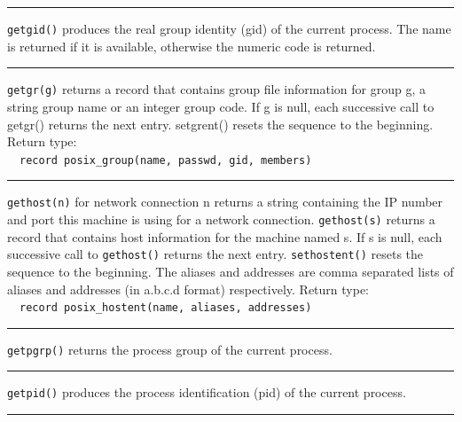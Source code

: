 \bigskip\hrule\vspace{0.1cm}

\noindent
\texttt{getgid()} produces the real group identity (gid) of the current process.
The name is returned if it is available, otherwise the numeric code is
returned.

\bigskip\hrule\vspace{0.1cm}

\noindent
\texttt{getgr(g)} returns a record that contains group file
information for group
g, a string group name or an integer group code. If g is null, each
successive call to getgr() returns the next entry. setgrent() resets
the sequence to the beginning. Return type:\\
\ \ \texttt{record posix\_group(name, passwd, gid, members)}

\bigskip\hrule\vspace{0.1cm}

\noindent
\texttt{gethost(n)} for network connection n returns a string containing
the IP number and port this machine is using for a network connection.
\texttt{gethost(s)} returns a record that contains host information for the
machine named s. If s is null, each successive call to \texttt{gethost()}
returns the next entry. \texttt{sethostent()} resets the sequence to the
beginning. The aliases and addresses are comma separated lists of
aliases and addresses (in a.b.c.d format) respectively. Return
type:\\
\ \ \texttt{record posix\_hostent(name, aliases, addresses)}

\bigskip\hrule\vspace{0.1cm}

\noindent
\texttt{getpgrp()} returns the process group of the current process. 

\bigskip\hrule\vspace{0.1cm}

\noindent
\texttt{getpid()} produces the process identification (pid) of the current
process.

\bigskip\hrule\vspace{0.1cm}

